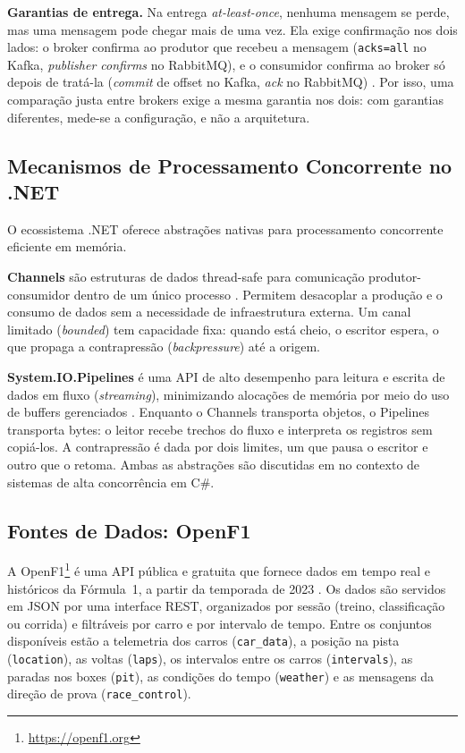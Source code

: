 \documentclass[12pt]{article}
\begin{document}
\textbf{Garantias de entrega.} Na entrega \textit{at-least-once}, nenhuma mensagem se
perde, mas uma mensagem pode chegar mais de uma vez. Ela exige confirmação nos dois
lados: o broker confirma ao produtor que recebeu a mensagem (\texttt{acks=all} no Kafka,
\textit{publisher confirms} no RabbitMQ), e o consumidor confirma ao broker só depois de
tratá-la (\textit{commit} de offset no Kafka, \textit{ack} no RabbitMQ)
\cite{kafka:docs,rabbitmq:docs}. Por isso, uma comparação justa entre brokers exige a
mesma garantia nos dois: com garantias diferentes, mede-se a configuração, e não a
arquitetura.

\subsection{Mecanismos de Processamento Concorrente no .NET}

O ecossistema .NET oferece abstrações nativas para processamento concorrente eficiente em
memória.

\textbf{Channels} são estruturas de dados thread-safe para comunicação
produtor-consumidor dentro de um único processo \cite{microsoft:channels}. Permitem
desacoplar a produção e o consumo de dados sem a necessidade de infraestrutura externa.
Um canal limitado (\textit{bounded}) tem capacidade fixa: quando está cheio, o escritor
espera, o que propaga a contrapressão (\textit{backpressure}) até a origem.

\textbf{System.IO.Pipelines} é uma API de alto desempenho para leitura e escrita de dados
em fluxo (\textit{streaming}), minimizando alocações de memória por meio do uso de buffers
gerenciados \cite{microsoft:pipelines}. Enquanto o Channels transporta objetos, o
Pipelines transporta bytes: o leitor recebe trechos do fluxo e interpreta os registros
sem copiá-los. A contrapressão é dada por dois limites, um que pausa o escritor e outro
que o retoma. Ambas as abstrações são discutidas em
\cite{cleary:2019} no contexto de sistemas de alta concorrência em C\#.

\subsection{Fontes de Dados: OpenF1}

A OpenF1\footnote{\url{https://openf1.org}} é uma API pública e gratuita que fornece dados
em tempo real e históricos da Fórmula~1, a partir da temporada de 2023
\cite{openf1:2024}. Os dados são servidos em JSON por uma interface REST, organizados por
sessão (treino, classificação ou corrida) e filtráveis por carro e por intervalo de tempo.
Entre os conjuntos disponíveis estão a telemetria dos carros (\texttt{car\_data}), a
posição na pista (\texttt{location}), as voltas (\texttt{laps}), os intervalos entre os
carros (\texttt{intervals}), as paradas nos boxes (\texttt{pit}), as condições do tempo
(\texttt{weather}) e as mensagens da direção de prova (\texttt{race\_control}).
\end{document}
